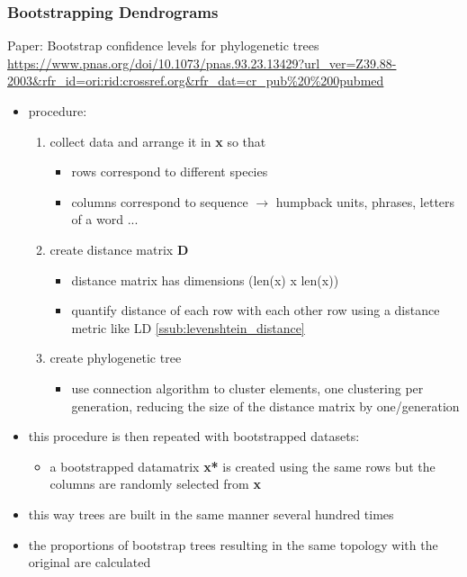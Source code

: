 \documentclass[12pt,a4paper]{article}
\begin{document}
\subsubsection{Bootstrapping Dendrograms} %
\label{ssub:bootstrapping_dendrograms}
Paper: Bootstrap confidence levels for phylogenetic trees
\url{https://www.pnas.org/doi/10.1073/pnas.93.23.13429?url_ver=Z39.88-2003&rfr_id=ori:rid:crossref.org&rfr_dat=cr_pub%20%200pubmed}
\begin{itemize}
  \item procedure:
  \begin{enumerate}
    \item collect data and arrange it in \textbf{x} so that
    \begin{itemize}
      \item rows correspond to different species
      \item columns correspond to sequence
      \newline \indent $\longrightarrow$ humpback units, phrases, letters of a word ...
    \end{itemize}
    \item create distance matrix \textbf{D}
    \begin{itemize}
      \item distance matrix has dimensions (len(x) x len(x))
      \item quantify distance of each row with each other row using a distance metric like LD \ref{ssub:levenshtein_distance}
    \end{itemize}
    \item create phylogenetic tree
    \begin{itemize}
      \item use connection algorithm to cluster elements, one clustering per generation, reducing the size of the distance matrix by one/generation
    \end{itemize}
  \end{enumerate}
  \item this procedure is then repeated with bootstrapped datasets:
  \begin{itemize}
    \item a bootstrapped datamatrix \textbf{x*} is created using the same rows but the columns are randomly selected from \textbf{x}
  \end{itemize}
  \item this way trees are built in the same manner several hundred times
  \item the proportions of bootstrap trees resulting in the same topology with the original are calculated

\end{itemize}
\end{document}
